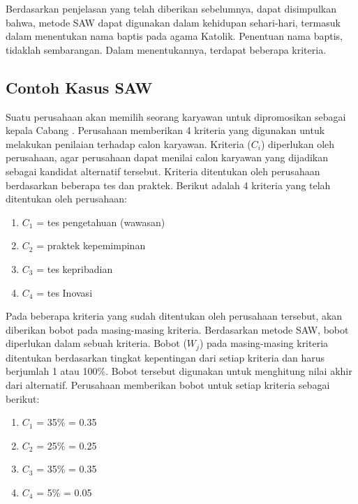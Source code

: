 	Berdasarkan penjelasan yang telah diberikan sebelumnya, dapat disimpulkan bahwa, metode SAW dapat digunakan dalam kehidupan sehari-hari, termasuk dalam menentukan nama baptis pada agama Katolik. Penentuan nama baptis, tidaklah sembarangan. Dalam menentukannya, terdapat beberapa kriteria.
	
\subsection{Contoh Kasus SAW}
\label{sec:contohsaw}
	
Suatu perusahaan akan memilih seorang karyawan untuk dipromosikan sebagai kepala Cabang \cite{contohsaw}. Perusahaan memberikan 4 kriteria yang digunakan untuk melakukan penilaian terhadap calon karyawan. Kriteria ($C_{i}$) diperlukan oleh perusahaan, agar perusahaan dapat menilai calon karyawan yang dijadikan sebagai kandidat alternatif tersebut. Kriteria ditentukan oleh perusahaan berdasarkan beberapa tes dan praktek. Berikut adalah 4 kriteria yang telah ditentukan oleh perusahaan:
\begin{enumerate}
	\item $C_{1}$ = tes pengetahuan (wawasan)
	\item $C_{2}$ = praktek kepemimpinan
	\item $C_{3}$ = tes kepribadian
	\item $C_{4}$ = tes Inovasi
\end{enumerate}

Pada beberapa kriteria yang sudah ditentukan oleh perusahaan tersebut, akan diberikan bobot pada masing-masing kriteria. Berdasarkan metode SAW, bobot diperlukan dalam sebuah kriteria. Bobot ($W_{j}$) pada masing-masing kriteria ditentukan berdasarkan tingkat kepentingan dari setiap kriteria dan harus berjumlah 1 atau 100\%. Bobot tersebut digunakan untuk menghitung nilai akhir dari alternatif. Perusahaan memberikan bobot untuk setiap kriteria sebagai berikut:
\begin{enumerate}
	\item $C_{1}$ = 35\% = 0.35
	\item $C_{2}$ = 25\% = 0.25
	\item $C_{3}$ = 35\% = 0.35
	\item $C_{4}$ = 5\%  = 0.05
\end{enumerate}

